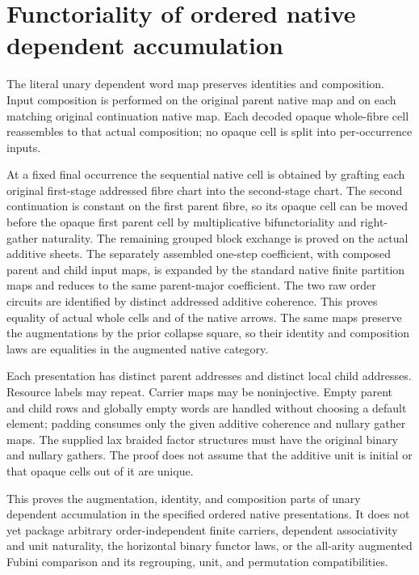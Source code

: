 \documentclass{article}
\begin{document}
\section*{Functoriality of ordered native dependent accumulation}
The literal unary dependent word map preserves identities and
composition. Input composition is performed on the original parent
native map and on each matching original continuation native map.
Each decoded opaque whole-fibre cell reassembles to that actual
composition; no opaque cell is split into per-occurrence inputs.

At a fixed final occurrence the sequential native cell is obtained
by grafting each original first-stage addressed fibre chart into
the second-stage chart. The second continuation is constant on the
first parent fibre, so its opaque cell can be moved before the
opaque first parent cell by multiplicative bifunctoriality and
right-gather naturality. The remaining grouped block exchange is
proved on the actual additive sheets. The separately assembled
one-step coefficient, with composed parent and child input maps, is
expanded by the standard native finite partition maps and reduces
to the same parent-major coefficient. The two raw order circuits
are identified by distinct addressed additive coherence. This
proves equality of actual whole cells and of the native arrows.
The same maps preserve the augmentations by the prior collapse
square, so their identity and composition laws are equalities
in the augmented native category.

Each presentation has distinct parent addresses and distinct local
child addresses. Resource labels may repeat. Carrier maps may be
noninjective. Empty parent and child rows and globally empty words
are handled without choosing a default element; padding consumes
only the given additive coherence and nullary gather maps. The
supplied lax braided factor structures must have the original
binary and nullary gathers. The proof does not assume that the
additive unit is initial or that opaque cells out of it are unique.

This proves the augmentation, identity, and composition parts of
unary dependent accumulation in the specified ordered native
presentations. It does not yet package arbitrary order-independent
finite carriers, dependent associativity and unit naturality, the
horizontal binary functor laws, or the all-arity augmented Fubini
comparison and its regrouping, unit, and permutation compatibilities.
\end{document}
